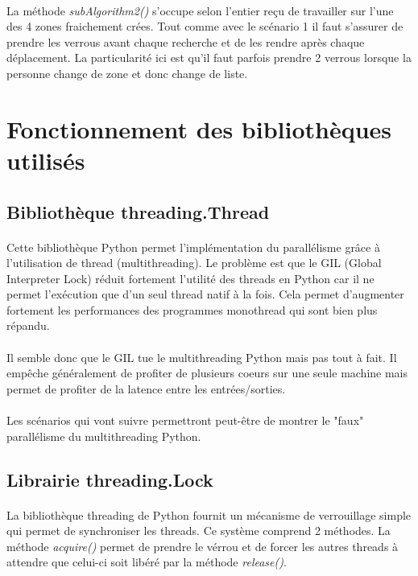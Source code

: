 \documentclass[12pt,oneside,a4paper]{article}
\begin{document}
\paragraph{}
La méthode \textit{subAlgorithm2()} s'occupe selon l'entier reçu de travailler sur l'une des 4 zones fraichement crées. Tout comme avec le scénario 1
il faut s'assurer de prendre les verrous avant chaque recherche et de les rendre après chaque déplacement.
La particularité ici est qu'il faut parfois prendre 2 verrous lorsque la personne change de zone et donc
change de liste.

\section{Fonctionnement des bibliothèques utilisés}

\subsection{Bibliothèque threading.Thread}
\paragraph{}
Cette bibliothèque Python permet l'implémentation du parallélisme grâce à l'utilisation de thread (multithreading).
Le problème est que le GIL (Global Interpreter Lock) réduit fortement l'utilité des threads en Python
car il ne permet l'exécution que d'un seul thread natif à la fois. Cela permet d'augmenter fortement les
performances des programmes monothread qui sont bien plus répandu.
\paragraph{}
Il semble donc que le GIL tue le multithreading Python mais pas tout à fait. Il empêche généralement de profiter
de plusieurs coeurs sur une seule machine mais permet de profiter de la latence entre les entrées/sorties.
\paragraph{}
Les scénarios qui vont suivre permettront peut-être de montrer le "faux" parallélisme du multithreading Python.

\subsection{Librairie threading.Lock}
\paragraph{}
La bibliothèque threading de Python fournit un mécanisme de verrouillage
simple qui permet de synchroniser les threads. Ce système
comprend 2 méthodes. La méthode \textit{acquire()} permet de prendre le vérrou et de 
forcer les autres threads à attendre que celui-ci soit libéré par la méthode 
\textit{release()}.
\end{document}
